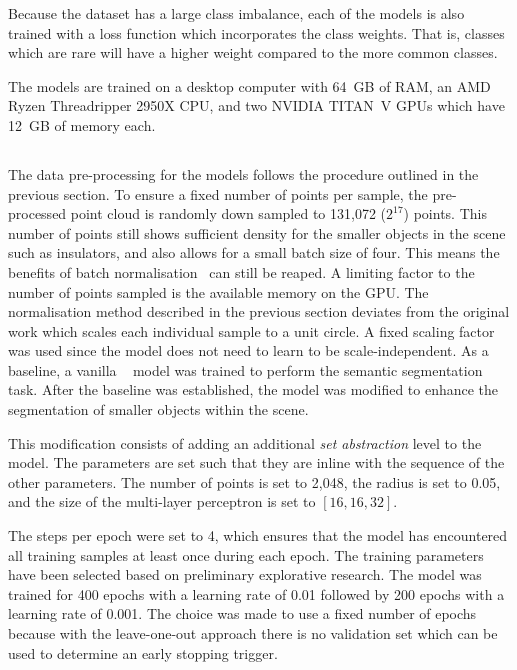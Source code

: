 Because the dataset has a large class imbalance, each of the models is also trained with a loss function which incorporates the class weights. That is, classes which are rare will have a higher weight compared to the more common classes.

The models are trained on a desktop computer with 64~GB of RAM, an AMD Ryzen Threadripper 2950X CPU, and two NVIDIA TITAN~V GPUs which have 12~GB of memory each.

\subsection{\pnpp{}}
The data pre-processing for the \pnpp{} models follows the procedure outlined in the previous section. To ensure a fixed number of points per sample, the pre-processed point cloud is randomly down sampled to 131,072 (\(2^{17}\)) points. This number of points still shows sufficient density for the smaller objects in the scene such as insulators, and also allows for a small batch size of four. This means the benefits of batch normalisation~\cite{ioffe15} can still be reaped. A limiting factor to the number of points sampled is the available memory on the GPU. The normalisation method described in the previous section deviates from the original \pnpp{} work which scales each individual sample to a unit circle. A fixed scaling factor was used since the model does not need to learn to be scale-independent. 
As a baseline, a vanilla \pnpp{}~\cite{Qi.17.2} model was trained to perform the semantic segmentation task. After the baseline was established, the \pnpp{} model was modified to enhance the segmentation of smaller objects within the scene.

This modification consists of adding an additional \textit{set abstraction} level to the model. The parameters are set such that they are inline with the sequence of the other parameters. The number of points is set to 2,048, the radius is set to 0.05, and the size of the multi-layer perceptron is set to $[16,16,32]$.

The steps per epoch were set to 4, which ensures that the model has encountered all training samples at least once during each epoch. The training parameters have been selected based on preliminary explorative research. The model was trained for 400 epochs with a learning rate of 0.01 followed by 200 epochs with a learning rate of 0.001. The choice was made to use a fixed number of epochs because with the leave-one-out approach there is no validation set which can be used to determine an early stopping trigger.

